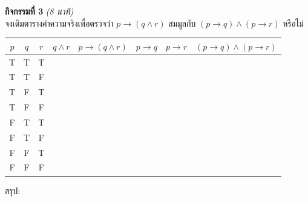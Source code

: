 \documentclass[a4paper,12pt]{article}
\begin{document}
\noindent\textbf{กิจกรรมที่ 3} \hfill \textit{(8 นาที)}\\
จงเติมตารางค่าความจริงเพื่อตรวจว่า $p \rightarrow (q \land r)$ สมมูลกับ $(p\rightarrow q)\land(p\rightarrow r)$ หรือไม่
\begin{center}\small
\begin{tabular}{|c|c|c|c|c|c|c|c|}
  \hline
  $p$ & $q$ & $r$ & $q\land r$ & $p\rightarrow(q\land r)$ & $p\rightarrow q$ & $p\rightarrow r$ & $(p\rightarrow q)\land(p\rightarrow r)$ \\ \hline
  T & T & T & & & & & \\ \hline
  T & T & F & & & & & \\ \hline
  T & F & T & & & & & \\ \hline
  T & F & F & & & & & \\ \hline
  F & T & T & & & & & \\ \hline
  F & T & F & & & & & \\ \hline
  F & F & T & & & & & \\ \hline
  F & F & F & & & & & \\ \hline
\end{tabular}
\end{center}
สรุป: \dotfill
\vspace{0.4em}
\end{document}
